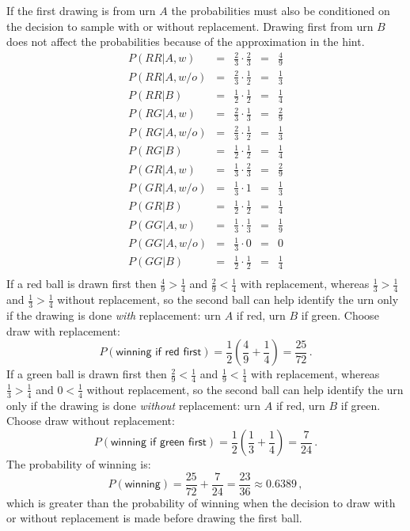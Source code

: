 If the first drawing is from urn $A$ the probabilities must also be conditioned on the decision to sample with or without replacement. Drawing first from urn $B$ does not affect the probabilities because of the approximation in the hint.
\[
\renewcommand*{\arraystretch}{1.5}
\begin{array}{lcccc}
P(RR|A,w) &=& \frac{2}{3} \cdot \frac{2}{3} &=& \frac{4}{9}\\
P(RR|A,w/o) &=& \frac{2}{3} \cdot \frac{1}{2} &=& \frac{1}{3}\\
P(RR|B) &=& \frac{1}{2} \cdot \frac{1}{2} &=& \frac{1}{4}\\
\hline
P(RG|A,w) &=& \frac{2}{3} \cdot \frac{1}{3} &=& \frac{2}{9}\\
P(RG|A,w/o) &=& \frac{2}{3} \cdot \frac{1}{2} &=& \frac{1}{3}\\
P(RG|B) &=& \frac{1}{2} \cdot \frac{1}{2} &=& \frac{1}{4}\\
\hline
P(GR|A,w) &=& \frac{1}{3} \cdot \frac{2}{3} &=& \frac{2}{9}\\
P(GR|A,w/o) &=& \frac{1}{3} \cdot 1 &=& \frac{1}{3}\\
P(GR|B) &=& \frac{1}{2} \cdot \frac{1}{2} &=& \frac{1}{4}\\
\hline
P(GG|A,w) &=& \frac{1}{3} \cdot \frac{1}{3} &=& \frac{1}{9}\\
P(GG|A,w/o) &=& \frac{1}{3} \cdot 0 &=&0\\
P(GG|B) &=& \frac{1}{2} \cdot \frac{1}{2} &=& \frac{1}{4}\\\end{array}
\]
If a red ball is drawn first then $\frac{4}{9}>\frac{1}{4}$ and $\frac{2}{9}<\frac{1}{4}$ with replacement, whereas $\frac{1}{3}>\frac{1}{4}$ and $\frac{1}{3}>\frac{1}{4}$ without replacement, so the second ball can help identify the urn only if the drawing is done \emph{with} replacement: urn $A$ if red, urn $B$ if green. Choose draw with replacement:
\[
P(\textsf{winning if red first})=\frac{1}{2}\left(\frac{4}{9}+\frac{1}{4}\right)=\frac{25}{72}\,.
\]
If a green ball is drawn first then $\frac{2}{9}<\frac{1}{4}$ and $\frac{1}{9}<\frac{1}{4}$ with replacement, whereas $\frac{1}{3}>\frac{1}{4}$ and $0<\frac{1}{4}$ without replacement, so the second ball can help identify the urn only if the drawing is done \emph{without} replacement: urn $A$ if red, urn $B$ if green. Choose draw without replacement:
\[
P(\textsf{winning if green first})=\frac{1}{2}\left(\frac{1}{3}+\frac{1}{4}\right)=\frac{7}{24}\,.
\]
The probability of winning is:
\[
P(\textsf{winning})=\frac{25}{72} + \frac{7}{24}=\frac{23}{36}\approx 0.6389\,,
\]
which is greater than the probability of winning when the decision to draw with or without replacement is made before drawing the first ball.

